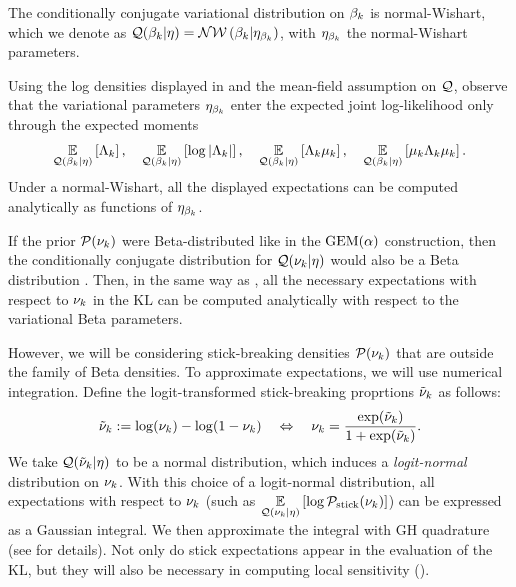 \begin{ex}
%
The conditionally conjugate variational distribution on $\beta_k$ is
normal-Wishart, which we denote as
$\mathcal{Q}(\beta_k \vert \eta) = \mathcal{N}\mathcal{W}\left(\beta_k \vert \eta_{\beta_k}\right)$,
with $\eta_{\beta_k}$ the normal-Wishart parameters.

Using the log densities displayed in 
and the mean-field assumption on $\mathcal{Q}$,
observe that the variational parameters $\eta_{\beta_k}$
enter the expected joint log-likelihood only through the
expected moments
%
\begin{align*}
\underset{\mathcal{Q}(\beta_k \vert \eta)}{\mathbb{E}}\left[\Lambda_k\right],  \quad
\underset{\mathcal{Q}(\beta_k \vert \eta)}{\mathbb{E}}\left[\log|\Lambda_k|\right],  \quad
\underset{\mathcal{Q}(\beta_k \vert \eta)}{\mathbb{E}}\left[\Lambda_k\mu_k\right], \quad
\underset{\mathcal{Q}(\beta_k \vert \eta)}{\mathbb{E}}\left[\mu_k\Lambda_k\mu_k\right].
\end{align*}
Under a normal-Wishart, all the displayed expectations
can be computed analytically as functions of $\eta_{\beta_k}$.
%
\end{ex}

If the prior $\mathcal{P}(\nu_{k})$ were Beta-distributed like in the $\mathrm{GEM}(\alpha)$
construction, then the conditionally conjugate distribution for $\mathcal{Q}(\nu_{k} \vert
\eta)$ would also be a Beta distribution \citep{blei:2006:vi_for_dp}. Then, in
the same way as , all the necessary expectations with
respect to $\nu_{k}$ in the $\mathrm{KL}$ can be computed analytically with respect
to the variational Beta parameters.

However, we will be considering stick-breaking densities $\mathcal{P}(\nu_{k})$
that are outside the family of Beta densities. To approximate expectations,
we will use numerical integration.  Define the logit-transformed stick-breaking
proprtions $\tilde{\nu}_{k}$ as follows:
%
\begin{align*}
  \tilde{\nu}_k := \log(\nu_k) - \log(1 - \nu_k)
  \quad \Leftrightarrow \quad
  \nu_{k} = \frac{\exp(\tilde{\nu}_k)}{1 + \exp(\tilde{\nu}_k)}.
\end{align*}
%
We take $\mathcal{Q}(\tilde{\nu}_{k} \vert \eta)$ to be a normal distribution, which induces a
\textit{logit-normal} distribution on $\nu_{k}$. With this choice of a logit-normal
distribution, all expectations with respect to $\nu_k$ (such as
$\underset{\mathcal{Q}(\nu_k\vert\eta)}{\mathbb{E}}\left[\log \mathcal{P}_{\mathrm{stick}}(\nu_k)\right]$) can be expressed as a
Gaussian integral. We then approximate the integral with GH quadrature (see
 for details). Not only do stick expectations appear in
the evaluation of the $\mathrm{KL}$, but they will also be necessary in
computing local sensitivity ().


